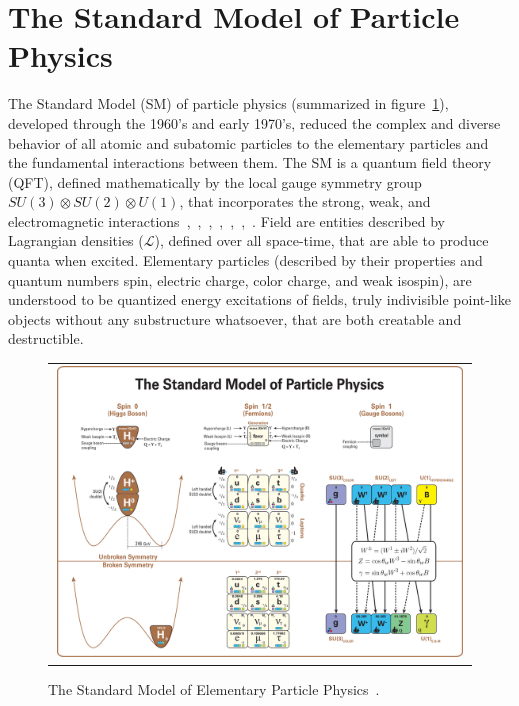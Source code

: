 \section{The Standard Model of Particle Physics}
The Standard Model (SM) of particle physics (summarized in figure~\ref{Standard_Model}), developed through the 1960's and early 1970's, reduced the complex and diverse behavior of all atomic and subatomic particles to the elementary particles and the fundamental interactions between them. 
The SM is a quantum field theory (QFT), defined mathematically by the local gauge symmetry group $SU(3) \otimes SU(2) \otimes U(1)$, that incorporates the strong, weak, and electromagnetic interactions~\cite{GLASHOW1961579},~\cite{PhysRevLett.19.1264},~\cite{doi:10.1142/9789812795915_0034},~\cite{HIGGS1964132},~\cite{PhysRevLett.13.508},~\cite{PhysRevLett.13.321},~\cite{PhysRevLett.30.1343}.
Field are entities described by Lagrangian densities ($\mathcal{L}$), defined over all space-time, that are able to produce quanta when excited.
Elementary particles (described by their properties and quantum numbers spin, electric charge, color charge, and  weak isospin), are understood to be quantized energy excitations of fields, truly indivisible point-like objects without any substructure whatsoever, that are both creatable and destructible.
\begin{figure}[htb]
  \begin{center}
    \begin{tabular}{c}
        \includegraphics[width=0.99\textwidth]{fig_Theory/Standard_Model.png}
    \end{tabular}
    \caption{The Standard Model of Elementary Particle Physics~\cite{StandardModel}.
            }
    \label{Standard_Model}
  \end{center}
\end{figure}


